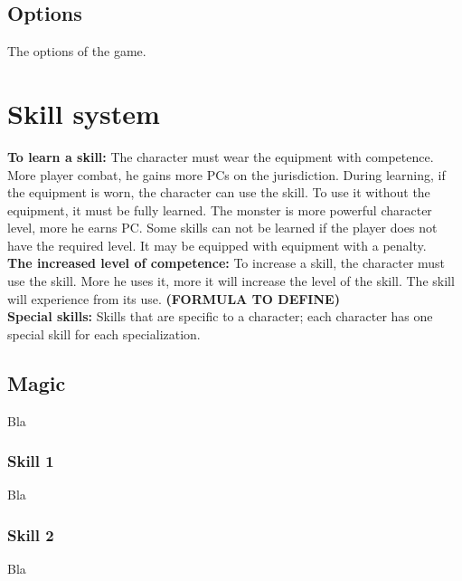 \documentclass[a4paper,12pt]{book}
\begin{document}
\subsection{Options}
The options of the game.
\section{Skill system}
\textbf{To learn a skill:} The character must wear the equipment with competence. More player combat, he gains more PCs on the jurisdiction. During learning, if the equipment is worn, the character can use the skill. To use it without the equipment, it must be fully learned. The monster is more powerful character level, more he earns PC. Some skills can not be learned if the player does not have the required level. It may be equipped with equipment with a penalty. \\
\textbf{The increased level of competence:} To increase a skill, the character must use the skill. More he uses it, more it will increase the level of the skill. The skill will experience from its use. \textbf{(FORMULA TO DEFINE)} \\
\textbf{Special skills:} Skills that are specific to a character; each character has one special skill for each specialization.
\subsection{Magic}
Bla
\subsubsection{Skill 1}
Bla
\subsubsection{Skill 2}
Bla
\end{document}
